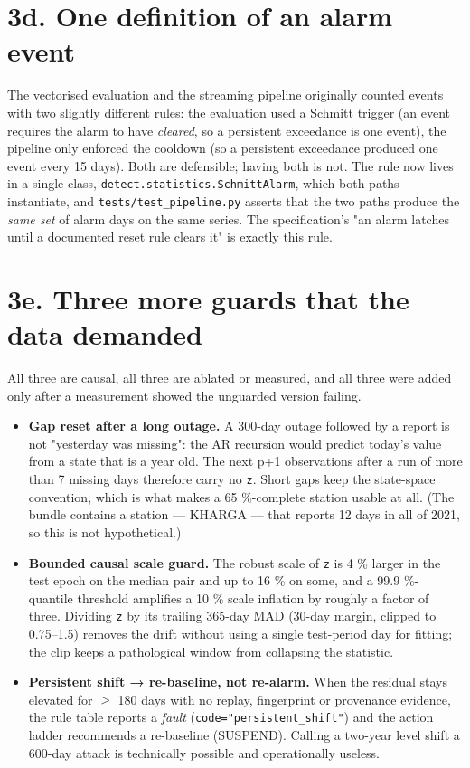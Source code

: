 \documentclass[10pt,a4paper]{article}
\begin{document}
\section*{3d. One definition of an alarm event}
The vectorised evaluation and the streaming pipeline originally counted events with two slightly different rules: the evaluation used a Schmitt trigger (an event requires the alarm to have \emph{cleared}, so a persistent exceedance is one event), the pipeline only enforced the cooldown (so a persistent exceedance produced one event every 15 days). Both are defensible; having both is not. The rule now lives in a single class, \texttt{detect.statistics.SchmittAlarm}, which both paths instantiate, and \texttt{tests/\allowbreak{}test\_\allowbreak{}pipeline.py} asserts that the two paths produce the \emph{same set} of alarm days on the same series. The specification's "an alarm latches until a documented reset rule clears it" is exactly this rule.

\section*{3e. Three more guards that the data demanded}
All three are causal, all three are ablated or measured, and all three were added only after a measurement showed the unguarded version failing.

\begin{itemize}
\item \textbf{Gap reset after a long outage.} A 300-\allowbreak{}day outage followed by a report is not
"yesterday was missing": the AR recursion would predict today's value from a state that is a year old. The next p+1 observations after a run of more than 7 missing days therefore carry no \texttt{z}. Short gaps keep the state-\allowbreak{}space convention, which is what makes a 65 \%-\allowbreak{}complete station usable at all. (The bundle contains a station — KHARGA — that reports 12 days in all of 2021, so this is not hypothetical.)

\item \textbf{Bounded causal scale guard.} The robust scale of \texttt{z} is 4 \% larger in the test
epoch on the median pair and up to 16 \% on some, and a 99.9 \%-\allowbreak{}quantile threshold amplifies a 10 \% scale inflation by roughly a factor of three. Dividing \texttt{z} by its trailing 365-\allowbreak{}day MAD (30-\allowbreak{}day margin, clipped to 0.75–1.5) removes the drift without using a single test-\allowbreak{}period day for fitting; the clip keeps a pathological window from collapsing the statistic.

\item \textbf{Persistent shift → re-\allowbreak{}baseline, not re-\allowbreak{}alarm.} When the residual stays elevated
for $\geq$ 180 days with no replay, fingerprint or provenance evidence, the rule table reports a \emph{fault} (\texttt{code="persistent\_\allowbreak{}shift"}) and the action ladder recommends a re-\allowbreak{}baseline (SUSPEND). Calling a two-\allowbreak{}year level shift a 600-\allowbreak{}day attack is technically possible and operationally useless.

\end{itemize}
\end{document}

